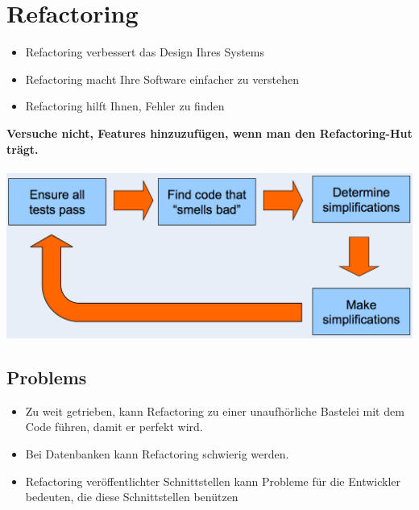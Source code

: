 \documentclass[a4paper,10pt]{article}
\newcommand{\Bold}[1]{\textbf{#1}} %
\begin{document}
\pagebreak
\section{Refactoring}
\begin{itemize}
	\item Refactoring verbessert das Design Ihres Systems
	\item Refactoring macht Ihre Software einfacher zu verstehen
	\item Refactoring hilft Ihnen, Fehler zu finden
\end{itemize}
\Bold {Versuche nicht, Features hinzuzufügen, wenn man den  Refactoring-Hut trägt.} \\ \\
\includegraphics[scale=0.4]{refactoring_workflow.png}

\subsection{Problems}
\begin{itemize}
	\item Zu weit getrieben, kann Refactoring zu einer unaufhörliche Bastelei mit dem Code führen, damit er perfekt wird.
	\item Bei Datenbanken kann Refactoring schwierig werden.
	\item Refactoring veröffentlichter Schnittstellen kann Probleme für die Entwickler bedeuten, die diese Schnittstellen benützen
\end{itemize}
\end{document}
